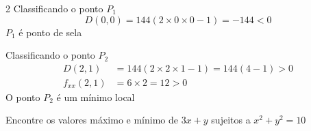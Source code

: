 \documentclass[a4paper,12pt,fleqn]{article}
\begin{document}
\begin{answer}
\begin{multicols*}{2}
  Classificando o ponto $P_1$
  \[
    D\left(0, 0\right)
    = 144(2\times 0 \times 0 - 1)
    = -144 < 0
  \]
  $P_1$ é ponto de sela

  Classificando o ponto $P_2$
  \begin{align*}
    D\left(2, 1\right)
    & = 144(2\times 2 \times 1 - 1)
      = 144(4-1) > 0 \\
    f_{xx}\left(2, 1\right)
    & = 6\times 2
      = 12 > 0
  \end{align*}
  O ponto $P_2$ é um mínimo local
\end{multicols*}
\end{answer}

Encontre os valores máximo e mínimo de
\(
  3x + y
\)
sujeitos a
\(
  x^2 + y^2 = 10
\)
\clearpagequestiononly
\end{document}
